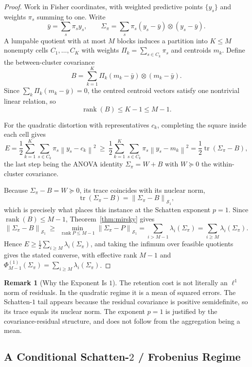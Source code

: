 \documentclass[12pt]{article}
\theoremstyle{definition}
\newtheorem{remark}[theorem]{Remark}
\DeclareMathOperator{\rank}{rank}
\DeclareMathOperator{\tr}{tr}
\newcommand{\norm}[1]{\left\lVert#1\right\rVert}
\newcommand{\Sp}[1]{\mathcal S_{#1}}
\begin{document}
\begin{proof}
Work in Fisher coordinates, with weighted predictive points $\{y_s\}$ and
weights $\pi_s$ summing to one.  Write
\[
\bar y=\sum_s\pi_sy_s,
\qquad
\Sigma_\pi=\sum_s\pi_s(y_s-\bar y)\otimes(y_s-\bar y).
\]
A lumpable quotient with at most $M$ blocks induces a partition into
$K\le M$ nonempty cells $C_1,\dots,C_K$ with weights
$\Pi_k=\sum_{s\in C_k}\pi_s$ and centroids $m_k$.  Define the between-cluster
covariance
\[
B=\sum_{k=1}^K\Pi_k(m_k-\bar y)\otimes(m_k-\bar y).
\]
Since $\sum_{k}\Pi_k(m_k-\bar y)=0$, the centred centroid vectors satisfy one
nontrivial linear relation, so
\[
\rank(B)\le K-1\le M-1 .
\]

For the quadratic distortion with representatives $c_k$, completing the square
inside each cell gives
\[
E
=
\frac12\sum_{k=1}^K\sum_{s\in C_k}\pi_s\norm{y_s-c_k}^2
\ \ge\
\frac12\sum_{k=1}^K\sum_{s\in C_k}\pi_s\norm{y_s-m_k}^2
=
\frac12\tr(\Sigma_\pi-B),
\]
the last step being the ANOVA identity $\Sigma_\pi=W+B$ with $W\succeq0$ the
within-cluster covariance.

Because $\Sigma_\pi-B=W\succeq0$, its trace coincides with its nuclear norm,
\[
\tr(\Sigma_\pi-B)=\norm{\Sigma_\pi-B}_{\Sp{1}},
\]
which is precisely what places this instance at the Schatten exponent $p=1$.
Since $\rank(B)\le M-1$, Theorem~\ref{thm:mirsky} gives
\[
\norm{\Sigma_\pi-B}_{\Sp{1}}
\ \ge\
\min_{\rank P\le M-1}\norm{\Sigma_\pi-P}_{\Sp{1}}
=
\sum_{i>M-1}\lambda_i(\Sigma_\pi)
=
\sum_{i\ge M}\lambda_i(\Sigma_\pi).
\]
Hence $E\ge\frac12\sum_{i\ge M}\lambda_i(\Sigma_\pi)$, and taking the infimum
over feasible quotients gives the stated converse, with effective rank $M-1$
and $\Phi^{(1)}_{M-1}(\Sigma_\pi)=\sum_{i\ge M}\lambda_i(\Sigma_\pi)$.
\end{proof}

\begin{remark}[Why the Exponent Is $1$]
\label{rem:retention-why-p1}
The retention cost is not literally an $\ell^1$ norm of residuals.  In the
quadratic regime it is a mean of squared errors.  The Schatten-$1$ tail appears
because the residual covariance is positive semidefinite, so its trace equals
its nuclear norm.  The exponent $p=1$ is justified by the covariance-residual
structure, and does not follow from the aggregation being a mean.
\end{remark}

\subsection{A Conditional Schatten-$2$ / Frobenius Regime}
\label{subsec:schatten-frobenius}
\end{document}
